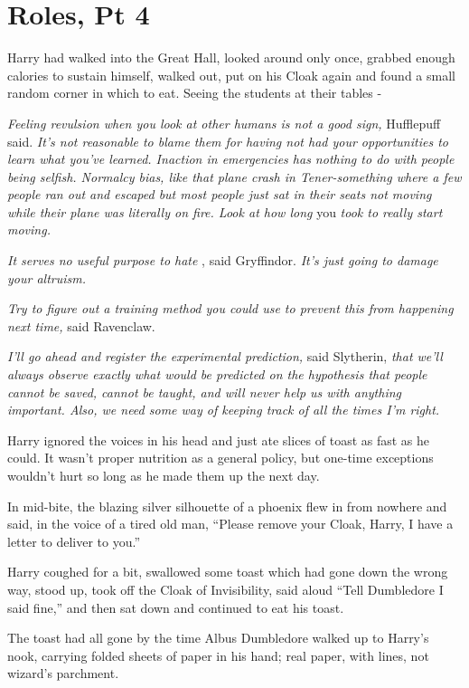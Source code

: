 \chapter{Roles, Pt 4}\label{roles-pt-4}

Harry had walked into the Great Hall, looked around only once, grabbed
enough calories to sustain himself, walked out, put on his Cloak again
and found a small random corner in which to eat. Seeing the students at
their tables -

\emph{Feeling revulsion when you look at other humans is not a good
sign,} Hufflepuff said. \emph{It's not reasonable to blame them for
having not had your opportunities to learn what you've learned. Inaction
in emergencies has nothing to do with people being selfish. Normalcy
bias, like that plane crash in Tener-something where a few people ran
out and escaped but most people just sat in their seats not moving while
their plane was literally on fire. Look at how long} you \emph{took to
really start moving.}

\emph{It serves no useful purpose to hate} , said Gryffindor. \emph{It's
just going to damage your altruism.}

\emph{Try to figure out a training method you could use to prevent this
from happening next time,} said Ravenclaw.

\emph{I'll go ahead and register the experimental prediction,} said
Slytherin, \emph{that we'll always observe exactly what would be
predicted on the hypothesis that people cannot be saved, cannot be
taught, and will never help us with anything important. Also, we need
some way of keeping track of all the times I'm right.}

Harry ignored the voices in his head and just ate slices of toast as
fast as he could. It wasn't proper nutrition as a general policy, but
one-time exceptions wouldn't hurt so long as he made them up the next
day.

In mid-bite, the blazing silver silhouette of a phoenix flew in from
nowhere and said, in the voice of a tired old man, ``Please remove your
Cloak, Harry, I have a letter to deliver to you.''

Harry coughed for a bit, swallowed some toast which had gone down the
wrong way, stood up, took off the Cloak of Invisibility, said aloud
``Tell Dumbledore I said fine,'' and then sat down and continued to eat
his toast.

The toast had all gone by the time Albus Dumbledore walked up to Harry's
nook, carrying folded sheets of paper in his hand; real paper, with
lines, not wizard's parchment.

